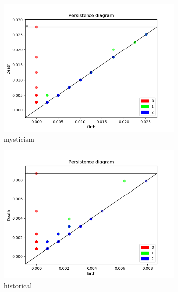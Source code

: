 \documentclass[fleqn]{article}
\begin{document}
\begin{figure}
	\begin{subfigure}[t]{0.425\textwidth}
    	\includegraphics[width=\textwidth]{figures/stopwords_excluded/mysticism.png}
    	\caption{mysticism}
        \label{fig:sw:mysticism}
    \end{subfigure}\hfill
	\begin{subfigure}[t]{0.425\textwidth}
    	\includegraphics[width=\textwidth]{figures/stopwords_excluded/hystorical.png}
    	\caption{historical}
        \label{fig:sw:historical}
    \end{subfigure}\hfill
    \\
	\begin{subfigure}[t]{0.425\textwidth}

\end{subfigure}
\end{figure}
\end{document}
